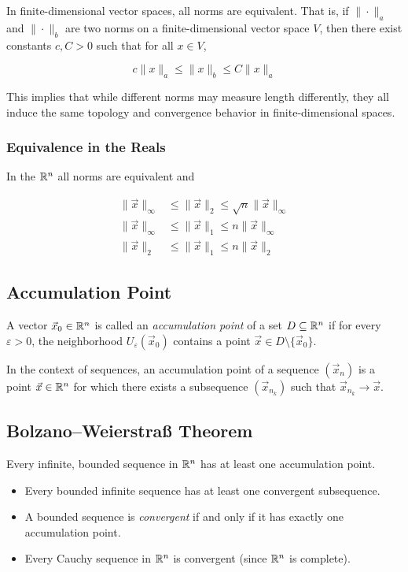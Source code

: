 In finite-dimensional vector spaces, all norms are equivalent. That is, if \( \|\cdot\|_a \) and 
\( \|\cdot\|_b \) are two norms on a finite-dimensional vector space \( V \), then there exist constants 
\( c, C > 0 \) such that for all \( x \in V \),

\[
    c \|x\|_a \leq \|x\|_b \leq C \|x\|_a
\]

This implies that while different norms may measure length differently, they all 
induce the same topology and convergence behavior in finite-dimensional spaces.

\subsubsection{Equivalence in the Reals}

In the \(\mathbb{R}^n\) all norms are equivalent and 

\begin{align*}
     \|\vec{x}\|_\infty &\le \|\vec{x}\|_2 \le \sqrt{n}\|\vec{x}\|_\infty \\
     \|\vec{x}\|_\infty &\le \|\vec{x}\|_1 \le n\|\vec{x}\|_\infty \\
     \|\vec{x}\|_2 &\le \|\vec{x}\|_1 \le n\|\vec{x}\|_2
\end{align*}

\subsection{Accumulation Point}

A vector \( \vec{x}_0 \in \mathbb{R}^n \) is called an \emph{accumulation point} of a set 
\( D \subseteq \mathbb{R}^n \) if for every \( \varepsilon > 0 \), the neighborhood 
\( U_\varepsilon(\vec{x}_0) \) contains a point \( \vec{x} \in D \setminus \{\vec{x}_0\} \).

In the context of sequences, an accumulation point of a sequence \( (\vec{x}_n) \) is a point 
\( \vec{x} \in \mathbb{R}^n \) for which there exists a subsequence \( (\vec{x}_{n_k}) \) such that 
\( \vec{x}_{n_k} \to \vec{x} \).

\subsection{Bolzano–Weierstraß Theorem}

Every infinite, bounded sequence in \( \mathbb{R}^n \) has at least one accumulation point.

\begin{itemize}
    
    \item Every bounded infinite sequence has at least one convergent subsequence.

    \item A bounded sequence is \emph{convergent} if and only if it has exactly one accumulation point.

    \item Every Cauchy sequence in \( \mathbb{R}^n \) is convergent (since \( \mathbb{R}^n \) is complete).

\end{itemize}

